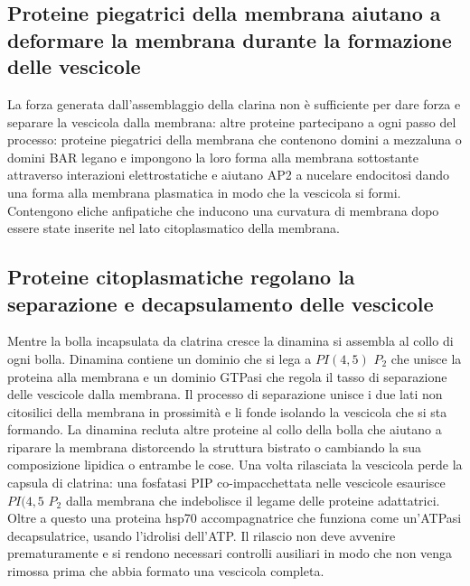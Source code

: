 \subsection{Proteine piegatrici della membrana aiutano a deformare la membrana durante la formazione delle vescicole}
La forza generata dall'assemblaggio della clarina non \`e sufficiente per dare forza e separare la vescicola dalla membrana: altre proteine partecipano a ogni passo del processo:
proteine piegatrici della membrana che contenono  domini a mezzaluna o domini BAR legano e impongono la loro forma alla membrana sottostante attraverso interazioni elettrostatiche e 
aiutano AP2 a nucelare endocitosi dando una forma alla membrana plasmatica in modo che la vescicola si formi. Contengono eliche anfipatiche che inducono una curvatura di membrana
dopo essere state inserite nel lato citoplasmatico della membrana.
\subsection{Proteine citoplasmatiche regolano la separazione e decapsulamento delle vescicole}
Mentre la bolla incapsulata da clatrina cresce la dinamina si assembla al collo di ogni bolla. Dinamina contiene un dominio che si lega a $PI(4,5)$ $P_2$ che unisce la proteina alla
membrana e un dominio GTPasi che regola il tasso di separazione delle vescicole dalla membrana. Il processo di separazione unisce i due lati non citosilici della membrana in prossimit\`a
e li fonde isolando la vescicola che si sta formando. La dinamina recluta altre proteine al collo della bolla che aiutano a riparare la membrana distorcendo la struttura bistrato o 
cambiando la sua composizione lipidica o entrambe le cose. Una volta rilasciata la vescicola perde la capsula di clatrina: una fosfatasi PIP co-impacchettata nelle vescicole esaurisce
$PI(4, 5$ $P_2$ dalla membrana che indebolisce il legame delle proteine adattatrici. Oltre a questo una proteina hsp70 accompagnatrice che funziona come un'ATPasi decapsulatrice, usando
l'idrolisi dell'ATP. Il rilascio non deve avvenire prematuramente e si rendono necessari controlli ausiliari in modo che non venga rimossa prima che abbia formato una vescicola completa.
